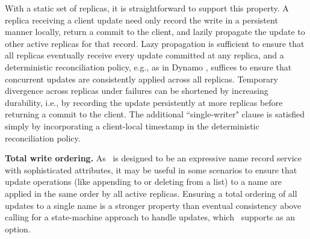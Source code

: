 With a static set of replicas, it is straightforward to support this property. A replica receiving  a client update need only record the write in a persistent manner locally, return a commit to the client, and lazily propagate the update to other active replicas for that record. Lazy propagation is sufficient to ensure that all replicas eventually receive every update committed at any replica, and a deterministic reconciliation policy, e.g., as in Dynamo \cite{dynamo}, suffices to ensure that concurrent updates are consistently applied across all replicas. Temporary divergence across replicas under failures can be shortened by increasing durability, i.e., by recording the update persistently at more replicas before returning a commit to the client. The additional ``single-writer" clause is satisfied simply by incorporating a client-local timestamp in the deterministic reconciliation policy. 



\textbf{Total write ordering.} As \auspice\ is designed to be an expressive name record service with sophisticated attributes, it may be useful in some scenarios to ensure that update operations (like appending to or deleting from a list) to a name are applied in the same order by all active replicas. Ensuring a total ordering of all updates to a single name is a stronger property than eventual consistency above calling for a state-machine approach to handle updates, which \auspice\ supports as an option.

